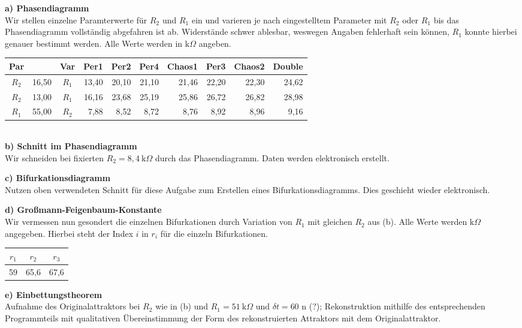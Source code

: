 \textbf{a) Phasendiagramm}\\
Wir stellen einzelne Paramterwerte für $R_2$ und $R_1$ ein und varieren je nach eingestelltem Parameter mit $R_2$ oder $R_1$ bis das Phasendiagramm vollständig abgefahren ist ab. Widerstände schwer ablesbar, weswegen Angaben fehlerhaft sein können, $R_1$ konnte hierbei genauer bestimmt werden. Alle Werte werden in $\text{k}\Omega$ angeben.\\
\begin{tabular}{c  r| c  r  r  r  r  r  r  r}
    Par &  & Var & Per1 & Per2 & Per4 & Chaos1 & Per3 & Chaos2 & Double\\
    \hline
    $R_2$ & 16,50 & $R_1$ & 13,40 & 20,10 & 21,10 & 21,46 & 22,20 & 22,30 & 24,62\\
    $R_2$ & 13,00 & $R_1$ & 16,16 & 23,68 & 25,19 & 25,86 & 26,72 & 26,82 & 28,98\\
    $R_1$ & 55,00 & $R_2$ & 7,88  & 8,52 & 8,72 & 8,76 & 8,92 & 8,96 & 9,16\\
\end{tabular}\\

\textbf{b) Schnitt im Phasendiagramm}\\
Wir schneiden bei fixierten $R_2=8,4~\text{k}\Omega$ durch das Phasendiagramm.
Daten werden elektronisch erstellt.

\textbf{c) Bifurkationsdiagramm}\\
Nutzen oben verwendeten Schnitt für diese Aufgabe zum Erstellen eines Bifurkationsdiagramms. Dies geschieht wieder elektronisch.

\textbf{d) Großmann-Feigenbaum-Konstante}\\
Wir vermessen nun gesondert die einzelnen Bifurkationen durch Variation von $R_1$ mit gleichen $R_2$ aus (b). Alle Werte werden $\text{k}\Omega$ angegeben. Hierbei steht der Index $i$ in $r_i$ für die einzeln Bifurkationen.\\
\begin{tabular}{c c c}
    $r_1$ & $r_2$ & $r_3$\\
    \hline
    59 & 65,6 & 67,6
\end{tabular}

\textbf{e) Einbettungstheorem}\\
Aufnahme des Originalattraktors bei $R_2$ wie in (b) und $R_1=51~\text{k}\Omega$ und $\delta t=60$ n (?); Rekonstruktion mithilfe des entsprechenden Programmteils mit qualitativen Übereinstimmung der Form des rekonstruierten Attraktors mit dem Originalattraktor.


%
%
